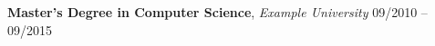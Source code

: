 
\textbf{Master's Degree in Computer Science}, \textit{Example University}
\hfill
09/2010 -- 09/2015

\vspace{-2mm}
